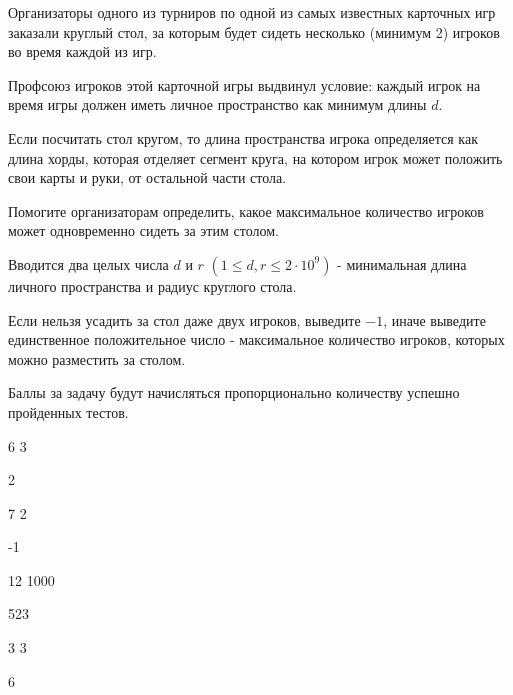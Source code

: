 
Организаторы одного из турниров по одной из самых известных карточных игр заказали круглый стол, 
за которым будет сидеть несколько (минимум 2) игроков во время каждой из игр.

Профсоюз игроков этой карточной игры выдвинул условие: каждый игрок на время игры 
должен иметь личное пространство как минимум длины $d$.

Если посчитать стол кругом, то длина пространства игрока определяется как длина хорды, 
которая отделяет сегмент круга, на котором игрок может положить свои карты и руки, от 
остальной части стола.

Помогите организаторам определить, какое максимальное количество игроков может одновременно 
сидеть за этим столом.


Вводится два целых числа $d$ и $r$ $(1 \leq d, r \leq 2 \cdot 10^{9})$ - минимальная длина личного 
пространства и радиус круглого стола.

\outputfmtSection

Если нельзя усадить за стол даже двух игроков, выведите $-1$, иначе выведите единственное 
положительное число - максимальное количество игроков, которых можно разместить за столом.

\markSection

Баллы за задачу будут начисляться пропорционально количеству успешно пройденных тестов.


\begin{myverbbox}[\small]{\vinput}
    6 3
\end{myverbbox}

\begin{myverbbox}[\small]{\voutput}
    2
\end{myverbbox}


\begin{myverbbox}[\small]{\vinput}
    7 2
\end{myverbbox}

\begin{myverbbox}[\small]{\voutput}
    -1
\end{myverbbox}


\begin{myverbbox}[\small]{\vinput}
    12 1000
\end{myverbbox}

\begin{myverbbox}[\small]{\voutput}
    523
\end{myverbbox}


\begin{myverbbox}[\small]{\vinput}
    3 3
\end{myverbbox}

\begin{myverbbox}[\small]{\voutput}
    6
\end{myverbbox}

